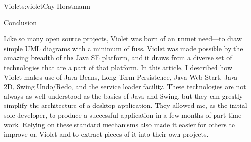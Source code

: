 \begin{aosachapter}{Violet}{s:violet}{Cay Horstmann}
\begin{aosasect1}{Conclusion}

Like so many open source projects, Violet was born of an unmet
need---to draw simple UML diagrams with a minimum of fuss. Violet was
made possible by the amazing breadth of the Java SE platform, and it
draws from a diverse set of technologies that are a part of that
platform. In this article, I described how Violet makes use of Java
Beans, Long-Term Persistence, Java Web Start, Java 2D, Swing
Undo/Redo, and the service loader facility.  These technologies are
not always as well understood as the basics of Java and Swing, but
they can greatly simplify the architecture of a desktop
application. They allowed me, as the initial sole developer, to
produce a successful application in a few months of part-time work.
Relying on these standard mechanisms also made it easier for others to
improve on Violet and to extract pieces of it into their own projects.

\end{aosasect1}

\end{aosachapter}
